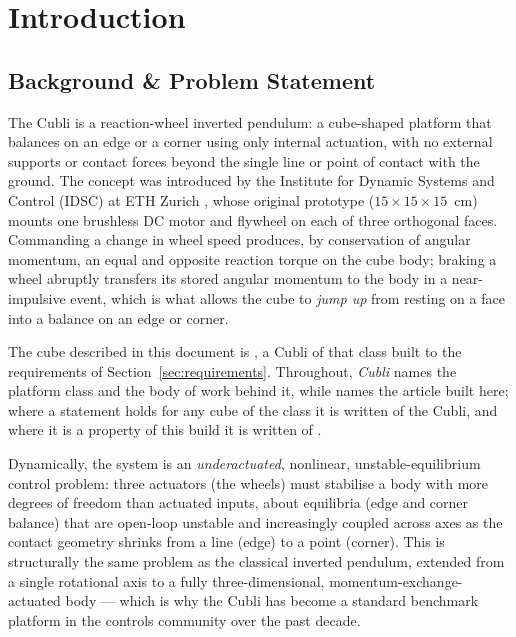 \section{Introduction}

\subsection{Background \& Problem Statement}
\label{sec:background}

The Cubli is a reaction-wheel inverted pendulum: a cube-shaped platform that balances on an edge or a corner using only internal actuation, with no external supports or contact forces beyond the single line or point of contact with the ground. The concept was introduced by the Institute for Dynamic Systems and Control (IDSC) at ETH Zurich \cite{gajamohan2012cubli, gajamohan2013cubli}, whose original prototype ($15\times15\times15$~cm) mounts one brushless DC motor and flywheel on each of three orthogonal faces. Commanding a change in wheel speed produces, by conservation of angular momentum, an equal and opposite reaction torque on the cube body; braking a wheel abruptly transfers its stored angular momentum to the body in a near-impulsive event, which is what allows the cube to \emph{jump up} from resting on a face into a balance on an edge or corner.

The cube described in this document is \projectname{}, a Cubli of that class built to the requirements of Section~\ref{sec:requirements}. Throughout, \emph{Cubli} names the platform class and the body of work behind it, while \emph{\projectname{}} names the article built here; where a statement holds for any cube of the class it is written of the Cubli, and where it is a property of this build it is written of \projectname{}.

Dynamically, the system is an \emph{underactuated}, nonlinear, unstable-equilibrium control problem: three actuators (the wheels) must stabilise a body with more degrees of freedom than actuated inputs, about equilibria (edge and corner balance) that are open-loop unstable and increasingly coupled across axes as the contact geometry shrinks from a line (edge) to a point (corner). This is structurally the same problem as the classical inverted pendulum, extended from a single rotational axis to a fully three-dimensional, momentum-exchange-actuated body — which is why the Cubli has become a standard benchmark platform in the controls community over the past decade.


